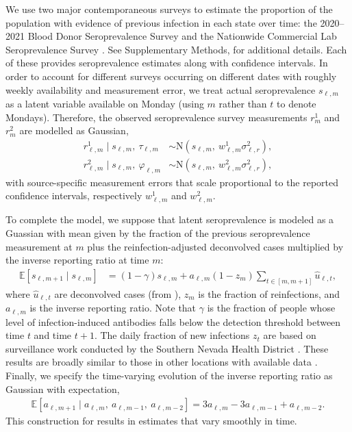 We use two major contemporaneous surveys to estimate the proportion of the
population with evidence of previous infection in each state over time: the
2020--2021 Blood Donor Seroprevalence Survey and the Nationwide Commercial Lab
Seroprevalence Survey \citep{cdc2021blood, cdc2021comm}. See Supplementary
Methods,  for additional details. Each of these provides
seroprevalence estimates along with confidence intervals. In order to account
for different surveys occurring on different dates with roughly weekly
availability and measurement error, we treat actual seroprevalence $s_{\ell,m}$
as a latent variable available on Monday (using $m$ rather than $t$ to denote
Mondays). Therefore, the observed seroprevalence survey measurements $r^1_m$ and
$r^2_m$ are modelled as Gaussian,
\begin{align}
\label{eq:sero-measurements}
r^1_{\ell,m} \mid s_{\ell,m},\ \tau_{\ell,m} &\sim \textrm{N}(s_{\ell,m},\ w^1_{\ell,m}\sigma^2_{\ell,r}),\\
r^2_{\ell,m} \mid s_{\ell,m},\  \varphi_{\ell,m}
  &\sim \textrm{N}(s_{\ell,m},\ w^2_{\ell,m}\sigma^2_{\ell,r}),
\end{align}
with source-specific measurement errors that scale proportional to the reported
confidence intervals, respectively $w^1_{\ell,m}$ and $w^2_{\ell,m}$.  

To complete the model, we suppose that latent seroprevalence is modeled as a
Guassian with mean given by the fraction of the previous seroprevalence
measurement at $m$ plus the reinfection-adjusted deconvolved cases multiplied by
the inverse reporting ratio at time $m$:
\begin{align}
  \label{eq:expect-sero}
\mathbb{E}[s_{\ell,m+1} \mid s_{\ell,m}] & = (1 -\gamma) s_{\ell,m} 
+ a_{\ell,m} (1 - z_{m}) \sum_{t\in[m,m+1]}\widehat{u}_{\ell,t},
\end{align}
where $\widehat{u}_{\ell,t}$ are deconvolved cases (from
), $z_{m}$ is the fraction of reinfections, and
$a_{\ell,m}$ is the inverse reporting ratio. Note that $\gamma$ is the fraction
of people whose level of infection-induced antibodies falls below the detection
threshold between time $t$ and time $t+1$. The daily fraction of new infections
$z_t$ are based on surveillance work conducted by the Southern Nevada Health
District \citep{ruff2022rapid}. These results are broadly similar to those in
other locations with available data  \citep{ruff2022rapid, nyreinfect2021,
hireinfect2022, wareinfect2022}. Finally, we specify the time-varying evolution
of the inverse reporting ratio as Gaussian with expectation,
\begin{align}
  \label{eq:report-ratio}
\mathbb{E}[a_{\ell,m+1} \mid a_{\ell,m},\ a_{\ell,m-1},\ a_{\ell,m-2}] = 3a_{\ell,m} - 3a_{\ell,m-1} + a_{\ell,m-2}.
\end{align}
This construction for  results in estimates that vary
smoothly in time.

